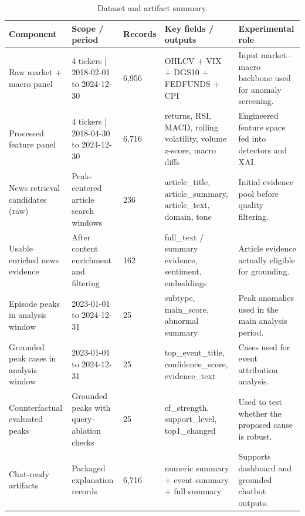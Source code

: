 \documentclass[11pt,a4paper,twoside]{article}
\begin{document}
\begin{table}[!htbp]
    \centering
    \scriptsize
    \setlength{\tabcolsep}{4pt}
    \renewcommand{\arraystretch}{1.15}
    \begin{tabularx}{\linewidth}{p{2.6cm} p{2.3cm} p{1.2cm} p{3.2cm} Y}
    \toprule
    \textbf{Component} & \textbf{Scope / period} & \textbf{Records} & \textbf{Key fields / outputs} & \textbf{Experimental role} \\
    \midrule
    Raw market + macro panel & 4 tickers | 2018-02-01 to 2024-12-30 & 6,956 & OHLCV + VIX + DGS10 + FEDFUNDS + CPI & Input market--macro backbone used for anomaly screening. \\
    Processed feature panel & 4 tickers | 2018-04-30 to 2024-12-30 & 6,716 & returns, RSI, MACD, rolling volatility, volume z-score, macro diffs & Engineered feature space fed into detectors and XAI. \\
    News retrieval candidates (raw) & Peak-centered article search windows & 236 & article\_title, article\_summary, article\_text, domain, tone & Initial evidence pool before quality filtering. \\
    Usable enriched news evidence & After content enrichment and filtering & 162 & full\_text / summary evidence, sentiment, embeddings & Article evidence actually eligible for grounding. \\
    Episode peaks in analysis window & 2023-01-01 to 2024-12-31 & 25 & subtype, main\_score, abnormal summary & Peak anomalies used in the main analysis period. \\
    Grounded peak cases in analysis window & 2023-01-01 to 2024-12-31 & 25 & top\_event\_title, confidence\_score, evidence\_text & Cases used for event attribution analysis. \\
    Counterfactual evaluated peaks & Grounded peaks with query-ablation checks & 25 & cf\_strength, support\_level, top1\_changed & Used to test whether the proposed cause is robust. \\
    Chat-ready artifacts & Packaged explanation records & 6,716 & numeric summary + event summary + full summary & Supports dashboard and grounded chatbot outputs. \\
    \bottomrule
    \end{tabularx}
    \caption{Dataset and artifact summary.}
    \label{tab:dataset_artifact_summary}
\end{table}
\end{document}
